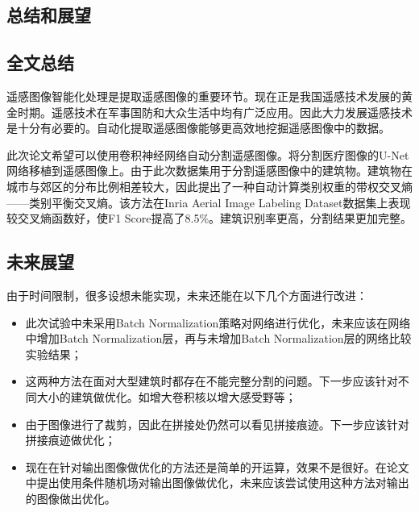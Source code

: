 \begin{spacing}{2}
    \section{总结和展望}
\end{spacing}

\subsection{全文总结}
遥感图像智能化处理是提取遥感图像的重要环节。现在正是我国遥感技术发展的黄金时期。遥感技术在军事国防和大众生活中均有广泛应用。因此大力发展遥感技术是十分有必要的。自动化提取遥感图像能够更高效地挖掘遥感图像中的数据。

此次论文希望可以使用卷积神经网络自动分割遥感图像。将分割医疗图像的U-Net网络移植到遥感图像上。由于此次数据集用于分割遥感图像中的建筑物。建筑物在城市与郊区的分布比例相差较大，因此提出了一种自动计算类别权重的带权交叉熵——类别平衡交叉熵。该方法在Inria Aerial Image Labeling Dataset数据集上表现较交叉熵函数好，使F1 Score提高了8.5\%。建筑识别率更高，分割结果更加完整。


\subsection{未来展望}

由于时间限制，很多设想未能实现，未来还能在以下几个方面进行改进：
\begin{itemize}
    \item 此次试验中未采用Batch Normalization策略\cite{ioffe2015batch}对网络进行优化，未来应该在网络中增加Batch Normalization层，再与未增加Batch Normalization层的网络比较实验结果；
    \item 这两种方法在面对大型建筑时都存在不能完整分割的问题。下一步应该针对不同大小的建筑做优化。如增大卷积核以增大感受野等；
    \item 由于图像进行了裁剪，因此在拼接处仍然可以看见拼接痕迹。下一步应该针对拼接痕迹做优化；
    \item 现在在针对输出图像做优化的方法还是简单的开运算，效果不是很好。在论文\cite{chandra2016fast}中提出使用条件随机场对输出图像做优化，未来应该尝试使用这种方法对输出的图像做出优化。
\end{itemize}